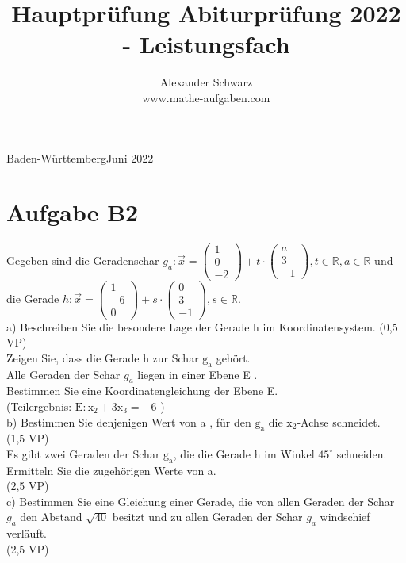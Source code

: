 \documentclass[10pt]{article}
\title{Hauptprüfung Abiturprüfung 2022 - Leistungsfach }
\author{Alexander Schwarz\\
www.mathe-aufgaben.com}
\date{}
\begin{document}
\maketitle
 Baden-WürttembergJuni 2022

\section*{Aufgabe B2}
Gegeben sind die Geradenschar $g_{a}: \vec{x}=\left(\begin{array}{c}1 \\ 0 \\ -2\end{array}\right)+t \cdot\left(\begin{array}{c}a \\ 3 \\ -1\end{array}\right), t \in \mathbb{R}, a \in \mathbb{R}$ und die Gerade $h: \vec{x}=\left(\begin{array}{c}1 \\ -6 \\ 0\end{array}\right)+s \cdot\left(\begin{array}{c}0 \\ 3 \\ -1\end{array}\right), s \in \mathbb{R}$.\\
a) Beschreiben Sie die besondere Lage der Gerade h im Koordinatensystem. (0,5 VP)\\
Zeigen Sie, dass die Gerade h zur Schar $\mathrm{g}_{\mathrm{a}}$ gehört.\\
Alle Geraden der Schar $g_{a}$ liegen in einer Ebene E .\\
Bestimmen Sie eine Koordinatengleichung der Ebene E.\\
(Teilergebnis: $\mathrm{E}: \mathrm{x}_{2}+3 \mathrm{x}_{3}=-6$ )\\
b) Bestimmen Sie denjenigen Wert von a , für den $\mathrm{g}_{\mathrm{a}}$ die $\mathrm{x}_{2}$-Achse schneidet.\\
(1,5 VP)\\
Es gibt zwei Geraden der Schar $\mathrm{g}_{\mathrm{a}}$, die die Gerade h im Winkel $45^{\circ}$ schneiden. Ermitteln Sie die zugehörigen Werte von a.\\
(2,5 VP)\\
c) Bestimmen Sie eine Gleichung einer Gerade, die von allen Geraden der Schar $g_{a}$ den Abstand $\sqrt{40}$ besitzt und zu allen Geraden der Schar $g_{a}$ windschief verläuft.\\
(2,5 VP)
\end{document}
